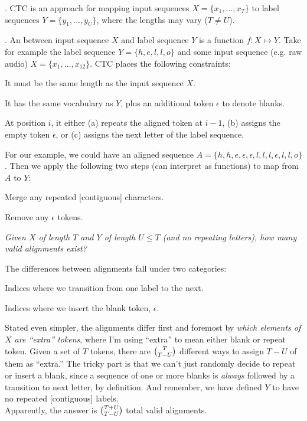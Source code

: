 \documentclass[11pt]{article}
\newcommand\myspace[1][]{\vspace{#1\bigskipamount}}
\newcommand\p{\Needspace{10\baselineskip} \noindent}
\newcommand\bluesec[1]{\myspace \p \blue{#1}}
\begin{document}
\bluesec{Introduction}. CTC is an approach for mapping input sequences $X = \{x_1, \ldots, x_T\}$ to label sequences $Y = \{y_1, \ldots, y_U \}$, where the lengths may vary ($T \ne U$). 


\bluesec{Alignment}. An  between input sequence $X$ and label sequence $Y$ is a function $f: X \mapsto Y$. Take for example the label sequence $Y = \{ h, e, l, l, o\}$ and some input sequence (e.g. raw audio) $X = \{x_1, \ldots, x_{12}\}$. CTC places the following constraints:
\begin{compactenum}
	\item It must be the same length as the input sequence $X$. 
	
	\item It has the same vocabulary as $Y$, plus an additional token $\epsilon$ to denote blanks. 
	
	\item At position $i$, it either (a) repeats the aligned token at $i-1$, (b) assigns the empty token $\epsilon$, or (c) assigns the next letter of the label sequence. 
\end{compactenum} 
For our example, we could have an aligned sequence $A = \{h, h, e, \epsilon, \epsilon, l, l, l, \epsilon, l, l, o\}$. Then we apply the following two steps (can interpret as functions) to map from $A$ to $Y$:
\begin{compactenum}
	\item Merge any repeated [contiguous] characters. 
	
	\item Remove any $\epsilon$ tokens. 
\end{compactenum}

\begin{example}
	{\itshape\small Given $X$ of length $T$ and $Y$ of length $U \le T$ (and no repeating letters), how many valid alignments exist?}
	\tcblower
	
	The differences between alignments fall under two categories:
	\begin{compactenum}
		\item Indices where we transition from one label to the next. 
		\item Indices where we insert the blank token, $\epsilon$. 
	\end{compactenum}
	\vspace{1em}
	
	Stated even simpler, the alignments differ first and foremost by \textit{which elements of $X$ are ``extra'' tokens}, where I'm using ``extra'' to mean either blank or repeat token. Given a set of $T$ tokens, there are $\tbinom{T}{T - U}$ different ways to assign $T - U$ of them as ``extra.'' The tricky part is that we can't just randomly decide to repeat or insert a blank, since a sequence of one or more blanks is \textit{always} followed by a transition to next letter, by definition. And remember, we have defined $Y$ to have no repeated [contiguous] labels. \\
	
	Apparently, the answer is $\tbinom{T + U}{ T - U}$ total valid alignments. 
\end{example}
\end{document}
